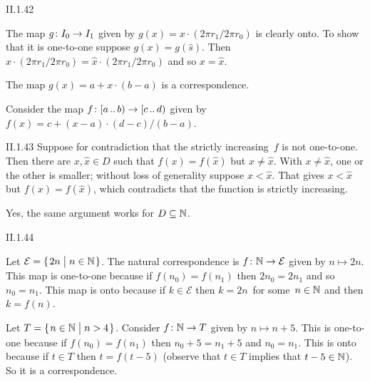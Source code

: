 \begin{ans}{II.1.42}
\begin{exparts}
\item
The map  $\mbox{$g\colon I_0\to I_1$}$ given by $g(x)=x\cdot(2\pi r_1/2\pi r_0)$
is clearly onto.
To show that it is one-to-one suppose $g(x)=g(\hat{s})$.
Then  $x\cdot(2\pi r_1/2\pi r_0)=\hat{x}\cdot(2\pi r_1/2\pi r_0)$ and so
$x=\hat{x}$.
\item The map $g(x)=a+x\cdot(b-a)$ is a correspondence.
\item Consider the map
  $\mbox{$f\colon [a\mathinner{{\ldotp}{\ldotp}} b)\to [c\mathinner{{\ldotp}{\ldotp}} d)$}$ given by
  $f(x)=c+(x-a)\cdot(d-c)/(b-a)$.
\end{exparts}
\end{ans}
%
\begin{ans}{II.1.43}
Suppose for contradiction that the strictly increasing~$f$ is not one-to-one.
Then there are $x,\hat{x}\in D$ such that
$f(x)=f(\hat{x})$ but $x\neq\hat{x}$.
With $x\neq\hat{x}$, one or the other is smaller; without loss of generality
suppose $x<\hat{x}$.
That gives $x<\hat{x}$ but $f(x)=f(\hat{x})$, which contradicts that the
function is strictly increasing.

Yes, the same argument works for $D\subseteq\mathbb{N}$.
\end{ans}
%
\begin{ans}{II.1.44}
\begin{exparts}
\item Let $\mathcal{E}=\set{2n\suchthat n\in\N}$.
The natural correspondence is $\mbox{$f\colon \mathbb{N}\to \mathcal{E}$}$
given by $n\mapsto 2n$.
This map is one-to-one because if $f(n_0)=f(n_1)$ then $2n_0=2n_1$
and so $n_0=n_1$.
This map is onto because if $k\in \mathcal{E}$ then $k=2n$~for some~$n\in\mathbb{N}$
and then $k=f(n)$.
\item Let $T=\set{n\in\N\suchthat n>4}$.
Consider $\mbox{$f\colon \mathbb{N}\to T$}$ given by $n\mapsto n+5$.
This is one-to-one because if $f(n_0)=f(n_1)$ then $n_0+5=n_1+5$
and $n_0=n_1$.
This is onto because if $t\in T$ then $t=f(t-5)$ (observe that
$t\in T$ implies that $t-5\in\mathbb{N}$).
So it is a correspondence.
\end{exparts}
\end{ans}
%
